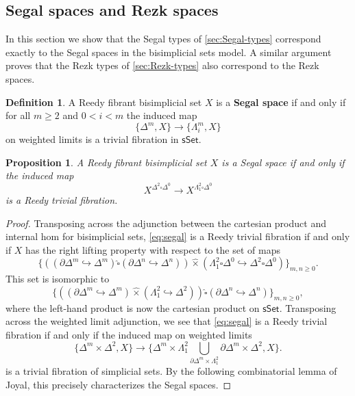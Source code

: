 \documentclass[12pt]{amsart}
\theoremstyle{plain}
\newtheorem{prop}[thm]{Proposition}
\theoremstyle{definition}
\newtheorem{defn}[thm]{Definition}
\theoremstyle{remark}
\numberwithin{equation}{section}
\newcommand{\sSet}{\mathsf{sSet}}
\begin{document}
\subsection{Segal spaces and Rezk spaces}

In this section we show that the Segal types of \cref{sec:Segal-types} correspond exactly to the Segal spaces in the bisimplicial sets model. A similar argument proves that the Rezk types of \cref{sec:Rezk-types} also correspond to the Rezk spaces. 

\begin{defn} A Reedy fibrant bisimplicial set $X$ is a \textbf{Segal space} if and only if for all $m \geq 2$ and $0 < i < m$ the induced map
\[ \{ \Delta^m,X\} \to \{\Lambda^m_i,X\}\] on weighted limits is a trivial fibration in $\sSet$.
\end{defn}



\begin{prop}\label{prop:joyal} A Reedy fibrant bisimplicial set $X$ is a Segal space if and only if the induced map
\begin{equation}\label{eq:segal} X^{\Delta^2 \square \Delta^0} \to X^{\Lambda^2_1 \square \Delta^0}\end{equation} is a Reedy trivial fibration.
\end{prop}
\begin{proof}
Transposing across the adjunction between the cartesian product and internal hom for bisimplicial sets, \eqref{eq:segal} is a Reedy trivial fibration if and only if $X$ has the right lifting property with respect to the set of maps
\[ \{ ( (\partial\Delta^m\hookrightarrow\Delta^m)\widehat{\square}(\partial\Delta^n\hookrightarrow\Delta^n)) \widehat{\times} (\Lambda^2_1 \square \Delta^0 \hookrightarrow \Delta^2 \square \Delta^0) \}_{m,n \geq 0}.\]
This set is isomorphic to
\[ \{ ( (\partial\Delta^m\hookrightarrow\Delta^m) \widehat{\times}(\Lambda^2_1\hookrightarrow\Delta^2))\widehat{\square}(\partial\Delta^n\hookrightarrow\Delta^n)  \}_{m,n \geq 0},\] where the left-hand product is now the cartesian product on $\sSet$. Transposing across the weighted limit adjunction, we see that \eqref{eq:segal} is a Reedy trivial fibration if and only if the induced map on weighted limits
\[ \{ \Delta^m \times \Delta^2, X\} \to \{ \Delta^m \times \Lambda^2_1 \bigcup\limits_{\partial\Delta^m\times \Lambda^2_1} \partial\Delta^m \times\Delta^2, X\}.\] is a trivial fibration of simplicial sets. By the following combinatorial lemma of Joyal, this precisely characterizes the Segal spaces.
\end{proof}
\end{document}
